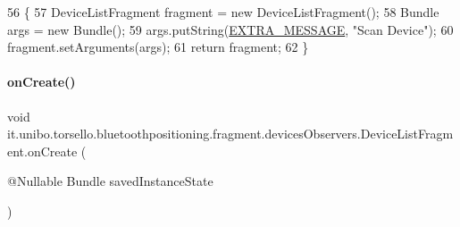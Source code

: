 \begin{DoxyCode}
56                                                    \{
57         DeviceListFragment fragment = \textcolor{keyword}{new} DeviceListFragment();
58         Bundle args = \textcolor{keyword}{new} Bundle();
59         args.putString(\hyperlink{classit_1_1unibo_1_1torsello_1_1bluetoothpositioning_1_1fragment_1_1devicesObservers_1_1DeviceListFragment_a6ba928c98442b32c8a32eb35b7cecf45_a6ba928c98442b32c8a32eb35b7cecf45}{EXTRA\_MESSAGE}, \textcolor{stringliteral}{"Scan Device"});
60         fragment.setArguments(args);
61         \textcolor{keywordflow}{return} fragment;
62     \}
\end{DoxyCode}
\hypertarget{classit_1_1unibo_1_1torsello_1_1bluetoothpositioning_1_1fragment_1_1devicesObservers_1_1DeviceListFragment_a5e548142d1a24ac89205c9e2adac82b6_a5e548142d1a24ac89205c9e2adac82b6}{}\label{classit_1_1unibo_1_1torsello_1_1bluetoothpositioning_1_1fragment_1_1devicesObservers_1_1DeviceListFragment_a5e548142d1a24ac89205c9e2adac82b6_a5e548142d1a24ac89205c9e2adac82b6} 
\paragraph{\texorpdfstring{on\+Create()}{onCreate()}}
{\footnotesize\ttfamily void it.\+unibo.\+torsello.\+bluetoothpositioning.\+fragment.\+devices\+Observers.\+Device\+List\+Fragment.\+on\+Create (\begin{DoxyParamCaption}\item[{@Nullable Bundle}]{saved\+Instance\+State }\end{DoxyParamCaption})}


